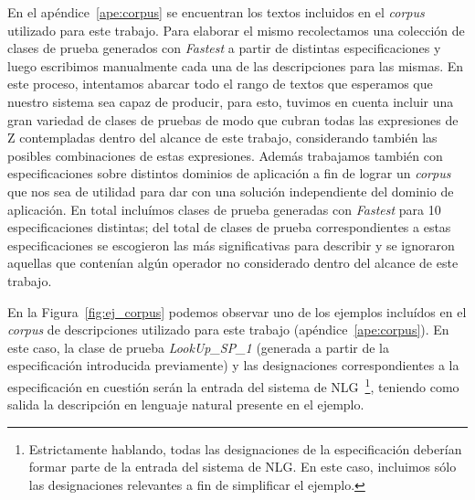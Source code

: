 En el apéndice~\ref{ape:corpus} se encuentran los textos incluidos en el \emph{corpus} utilizado para este trabajo. Para elaborar el mismo recolectamos una colección de clases de prueba generados con \emph{Fastest} a partir de distintas especificaciones y luego escribimos manualmente cada una de las descripciones para las mismas. En este proceso, intentamos abarcar todo el rango de textos que esperamos que nuestro sistema sea capaz de producir, para esto, tuvimos en cuenta incluir una gran variedad de clases de pruebas de modo que cubran todas las expresiones de Z contempladas dentro del alcance de este trabajo, considerando también las posibles combinaciones de estas expresiones. Además trabajamos también con especificaciones sobre distintos dominios de aplicación a fin de lograr un \emph{corpus} que nos sea de utilidad para dar con una solución independiente del dominio de aplicación. En total incluímos clases de prueba generadas con \emph{Fastest} para 10 especificaciones distintas; del total de clases de prueba correspondientes a estas especificaciones se escogieron las más significativas para describir y se ignoraron aquellas que contenían algún operador no considerado dentro del alcance de este trabajo.


En la Figura~\ref{fig:ej_corpus} podemos observar uno de los ejemplos incluídos en el \emph{corpus} de descripciones utilizado para este trabajo (apéndice~\ref{ape:corpus}). En este caso, la clase de prueba \emph{LookUp\_SP\_1} (generada a partir de la especificación introducida previamente) y las designaciones correspondientes a la especificación en cuestión serán la entrada del sistema de NLG~\footnote{Estrictamente hablando, todas las designaciones de la especificación deberían formar parte de la entrada del sistema de NLG. En este caso, incluimos sólo las designaciones relevantes a fin de simplificar el ejemplo.}, teniendo como salida la descripción en lenguaje natural presente en el ejemplo.

